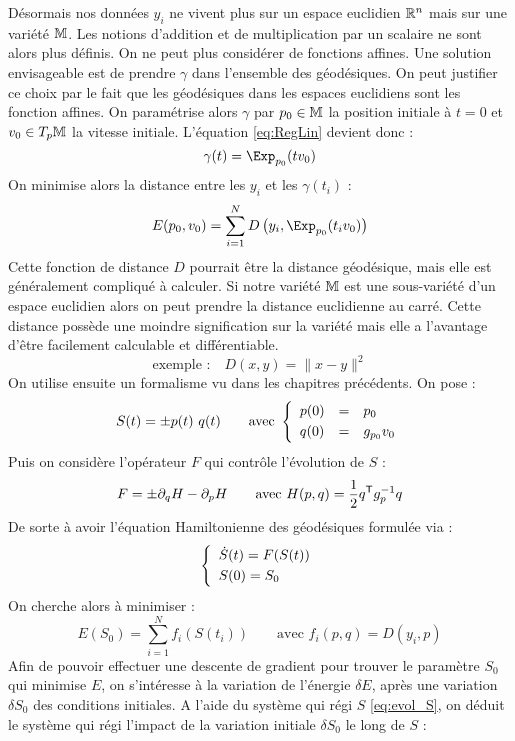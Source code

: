 Désormais nos données $y_i$ ne vivent plus sur un espace euclidien $\R^n$ mais sur une variété $\M$. Les notions d'addition et de multiplication par un scalaire ne sont alors plus définis. On ne peut plus considérer de fonctions affines. Une solution envisageable est de prendre $\gamma$ dans l'ensemble des géodésiques. On peut justifier ce choix par le fait que les géodésiques dans les espaces euclidiens sont les fonction affines. On paramétrise alors $\gamma$ par $p_0 \in \M$ la position initiale à $t=0$ et $v_0 \in T_p \M$ la vitesse initiale. L'équation \eqref{eq:RegLin} devient donc :
\begin{equation}
	\gamma(t) = \Exp_{p_0} (t v_0)
\end{equation}
On minimise alors la distance entre les $y_i$ et les $\gamma(t_i)$ :
$$ E(p_0, v_0) = \sum_{i=1}^N D \left( y_i, \Exp_{p_0}(t_i v_0) \right) $$
Cette fonction de distance $D$ pourrait être la distance géodésique, mais elle est généralement compliqué à calculer. Si notre variété $\M$ est une sous-variété d'un espace euclidien alors on peut prendre la distance euclidienne au carré. Cette distance possède une moindre signification sur la variété mais elle a l'avantage d'être facilement calculable et différentiable.
$$ \text{exemple :} \quad D(x, y) = \| x - y \|^2 $$
On utilise ensuite un formalisme vu dans les chapitres précédents. On pose :
\begin{equation}
	S(t) = \pm{p(t) \\[1mm]\ q(t)} \qquad \text{avec } \syst{lll}{p(0) & = & p_0 \\[1mm] q(0) & = & g_{p_0} v_0}
\end{equation}
Puis on considère l'opérateur $F$ qui contrôle l'évolution de $S$ :
\begin{equation}
	\label{eq:op_F}
	F = \pm{\partial_q H \\[1mm] - \partial_p H} \qquad \text{avec } H(p, q) = \frac{1}{2} q^\trans g_p^{-1} q
\end{equation}
De sorte à avoir l'équation Hamiltonienne des géodésiques formulée via :
\begin{equation}
	\label{eq:evol_S}
	\syst{lll}{
		\dot{S}(t) = F(S(t)) \\[1mm]
		S(0) = S_0
	}
\end{equation}
On cherche alors à minimiser :
\begin{equation}
	E(S_0) = \sum_{i=1}^N f_i(S(t_i)) \qquad \text{avec } f_i(p, q) = D(y_i, p)
\end{equation}
Afin de pouvoir effectuer une descente de gradient pour trouver le paramètre $S_0$ qui minimise $E$, on s'intéresse à la variation de l'énergie $\delta E$, après une variation $\delta S_0$ des conditions initiales. A l'aide du système qui régi $S$ \eqref{eq:evol_S}, on déduit le système qui régi l'impact de la variation initiale $\delta S_0$ le long de $S$ :
